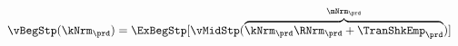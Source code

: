  \begin{equation}\begin{gathered}\begin{aligned}
        \vBegStp(\kNrm_{\prd}) & = \ExBegStp[\vMidStp(\overbrace{\kNrm_{\prd} \RNrm_{\prd} + \TranShkEmp_{\prd}}^{\mNrm_{\prd}})]  \label{eq:vBegStp}
      \end{aligned}\end{gathered}\end{equation}
